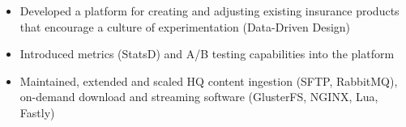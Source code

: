 \documentclass[10pt,a4paper]{altacv}
\begin{document}
\divider

\begin{itemize}
\item Developed a platform for creating and adjusting existing insurance products that encourage a culture of experimentation (Data-Driven Design)
\item Introduced metrics (StatsD) and A/B testing capabilities into the platform
\end{itemize}

\divider

\begin{itemize}
\item Maintained, extended and scaled HQ content ingestion (SFTP, RabbitMQ), on-demand download and streaming software (GlusterFS, NGINX, Lua, Fastly)
\end{itemize}

\divider


\clearpage
\nocite{*}

\end{document}
